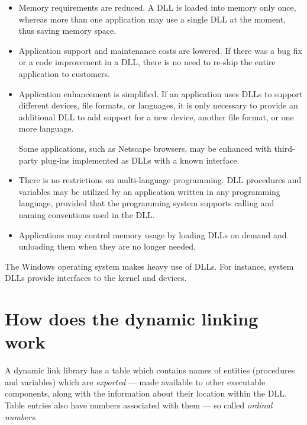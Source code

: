 \begin{itemize}
\item Memory requirements are reduced. A DLL is loaded into memory
      only once, whereas more than one application may use a single DLL
      at the moment, thus saving memory space.

\item Application support and maintenance costs are lowered. If there was
      a bug fix or a code improvement in a DLL, there is no need to
      re-ship the entire application to customers.

\item Application enhancement is simplified. If an
      application uses DLLs to support different devices, file
      formats, or languages, it is only necessary to provide an
      additional DLL to add support for a new device, another file format,
      or one more language.

      Some applications, such as Netscape browsers, may be enhanced with
      third-party plug-ins implemented as DLLs with a known interface.

\item There is no restrictions on multi-language programming.
      DLL procedures and variables
      may be utilized by an application written in any programming
      language, provided that the programming system supports calling and
      naming conventions used in the DLL.

\item Applications may control memory usage by loading DLLs on demand
      and unloading them when they are no longer needed.

\end{itemize}

The Windows operating system makes heavy use of DLLs.
For instance, system DLLs provide interfaces to the kernel and devices.

\section{How does the dynamic linking work}
\label{dll:overview}

A dynamic link library has a table which contains names of entities (procedures
and variables) which are {\em exported} --- made available to other executable
components, along with the information about their location within the DLL.
Table entries also have numbers associated with them --- so called
{\em ordinal numbers}.

